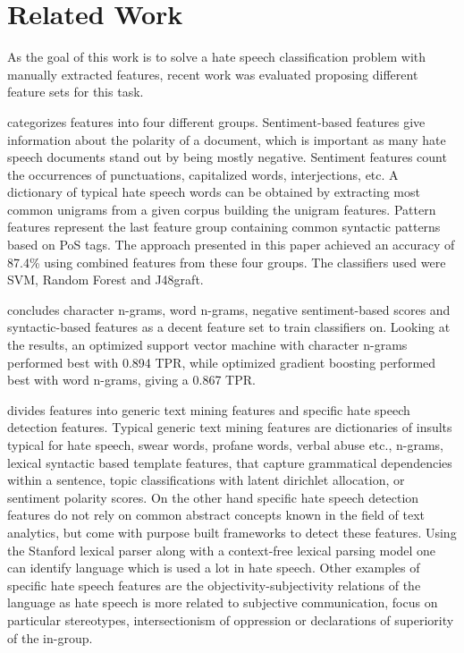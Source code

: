 \newpage
\section{Related Work} \label{related_work}

As the goal of this work is to solve a hate speech classification problem with manually extracted features, recent work was evaluated proposing different feature sets for this task. 

\cite{Watanabe2018} categorizes features into four different groups. Sentiment-based fea\-tures give information about the polarity of a document, which is important as many hate speech documents stand out by being mostly negative. Sentiment features count the occurrences of punctuations, capitalized words, interjections, etc. A dictionary of typical hate speech words can be obtained by extracting most common unigrams from a given corpus building the unigram features. Pattern features represent the last feature group containing common syntactic patterns based on PoS tags. The approach presented in this paper achieved an accuracy of 87.4\% using combined features from these four groups. The classifiers used were SVM, Random Forest and J48graft.

\cite{Oriola2020} concludes character n-grams, word n-grams, negative sentiment-based scores and syntactic-based features as a decent feature set to train classifiers on. Looking at the results, an optimized support vector machine with character n-grams performed best with 0.894 TPR, while optimized gradient boosting performed best with word n-grams, giving a 0.867 TPR. 

\cite{Fortuna2018} divides features into generic text mining features and specific hate speech detection features. Typical generic text mining features are dictionaries of insults typical for hate speech, swear words, profane words, verbal abuse etc., n-grams, lexical syntactic based template features, that capture gram\-mat\-i\-cal dependencies within a sentence, topic classifications with latent dirich\-let allocation, or sentiment polarity scores. On the other hand specific hate speech detection features do not rely on common abstract concepts known in the field of text analytics, but come with purpose built frameworks to detect these features. Using the Stanford lexical parser along with a context-free lexical parsing model one can identify language which is used a lot in hate speech. Other examples of specific hate speech features are the objectivity-subjectivity relations of the language as hate speech is more related to subjective communication, focus on particular stereotypes, in\-ter\-sec\-tion\-ism of oppression or declarations of superiority of the in-group. 

